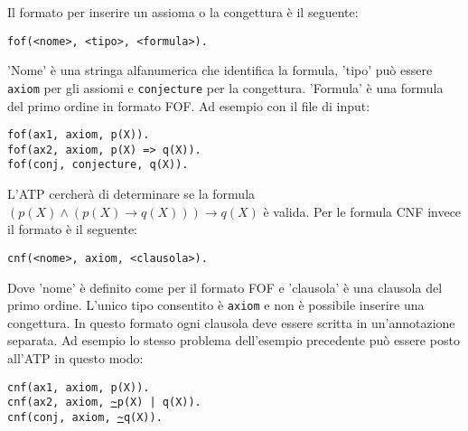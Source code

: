 \documentclass[./main.tex]{subfiles}
\begin{document}
Il formato per inserire un assioma o la congettura è il seguente:

\begin{center}
  \texttt{fof(<nome>, <tipo>, <formula>).}
\end{center}
'Nome' è una stringa alfanumerica che identifica la formula, 'tipo' può essere \texttt{axiom} per gli assiomi e \texttt{conjecture} per la congettura.
'Formula' è una formula del primo ordine in formato FOF. Ad esempio con il file di input:

\begin{center}
  \texttt{fof(ax1, axiom, p(X)).} \\
  \texttt{fof(ax2, axiom, p(X) => q(X)).} \\
  \texttt{fof(conj, conjecture, q(X)).} \\
\end{center}

L'ATP cercherà di determinare se la formula $(p(X) \land (p(X) \rightarrow q(X))) \rightarrow q(X)$ è valida.
Per le formula CNF invece il formato è il seguente:

\begin{center}
  \texttt{cnf(<nome>, axiom, <clausola>).}
\end{center}

Dove 'nome' è definito come per il formato FOF e 'clausola' è una clausola del primo ordine.
L'unico tipo consentito è \texttt{axiom} e non è possibile inserire una congettura.
In questo formato ogni clausola deve essere scritta in un'annotazione separata.
Ad esempio lo stesso problema dell'esempio precedente può essere posto all'ATP in questo modo:

\begin{center}
  \texttt{cnf(ax1, axiom, p(X)).} \\
  \texttt{cnf(ax2, axiom, \url{~}p(X) | q(X)).} \\
  \texttt{cnf(conj, axiom, \url{~}q(X)).} \\
\end{center}
\end{document}
